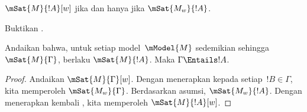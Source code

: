 \documentclass[../../../include/open-logic-section]{subfiles}
\begin{document}
\begin{prop}
  $\mSat{M}{!A}[w]$ jika dan hanya jika $\mSat{M_w}{!A}$.
\end{prop}

\begin{prob}
  Buktikan .
\end{prob}

\begin{prop}
  Andaikan bahwa, untuk setiap model~$\mModel{M}$ sedemikian sehingga
  $\mSat{M}{\Gamma}$, berlaku $\mSat{M}{!A}$. Maka
  $\Gamma\Entails !A$.
\end{prop}

\begin{proof}
  Andaikan $\mSat{M}{\Gamma}[w]$. Dengan menerapkan
   kepada setiap~$!B\in\Gamma$, kita memperoleh
  $\mSat{M_w}{\Gamma}$. Berdasarkan asumsi, $\mSat{M_w}{!A}$. Dengan
  menerapkan kembali , kita memperoleh
  $\mSat{M}{!A}[w]$.
\end{proof}
\end{document}
